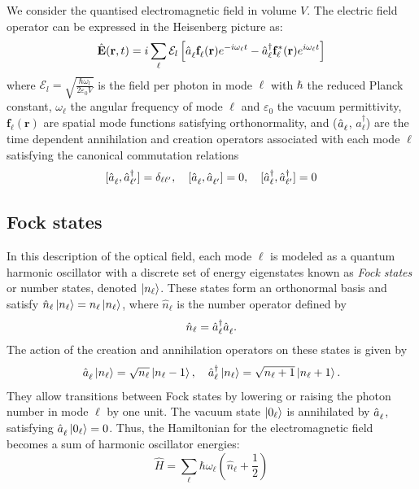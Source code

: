 We consider the quantised electromagnetic field in volume $V$. The electric field operator can be expressed in the Heisenberg picture as:
\begin{equation}
\hat{\mathbf{E}}(\mathbf{r}, t) = i \sum_{ \ell} \mathcal{E}_l \left[\hat{a}_{\ell}^{\vphantom{dagger}}\mathbf{f}_{\ell}^{\vphantom{*}}(\mathbf{r})e^{-i\omega_{\ell}t} - \hat{a}_{\ell}^\dagger \mathbf{f}_{\ell}^*(\mathbf{r}) e^{i\omega_{\ell}t}\right]
\end{equation}
where $\mathcal{E}_l = \sqrt{\frac{\hbar \omega_l}{2 \varepsilon_0 V}}$ is the field per photon in mode $\ell$ with $\hbar$ the reduced Planck constant, $\omega_\ell$ the angular frequency of mode $\ell$ and $\varepsilon_0$ the vacuum permittivity, $\mathbf{f}_{\ell}(\mathbf{r})$ are spatial mode functions satisfying orthonormality, and ($\hat{a}_{\ell}^{\vphantom{\dagger}}$, $\hat{a}_{\ell}^{\dagger}$) are the time dependent annihilation and creation operators associated with each mode $\ell$ satisfying the canonical commutation relations
\[
[\hat{a}_{\ell}^{\vphantom{\dagger}}, \hat{a}_{\ell'}^\dagger] = \delta_{\ell \ell'} , \quad
[\hat{a}_{\ell}^{\vphantom{\dagger}}, \hat{a}_{\ell'}^{\vphantom{\dagger}} ] = 0, \quad [\hat{a}_{\ell}^\dagger , \hat{a}_{\ell'}^\dagger ] = 0  
\]
\subsection*{Fock states}
In this description of the optical field, each mode $\ell$ is modeled as a quantum harmonic oscillator with a discrete set of energy eigenstates known as \textit{Fock states} or number states, denoted $\ket{n_\ell}$. These states form an orthonormal basis and satisfy $\hat{n}_{\ell} \ket{n_\ell} = n_\ell \ket{n_\ell}$, where $\hat{n}_{\ell}$ is the number operator defined by
\[
\hat{n}_{\ell} = \hat{a}_{\ell}^\dagger \hat{a}^{\vphantom{\dagger}}_{\ell}.
\]
The action of the creation and annihilation operators on these states is given by
\[
\hat{a}^{\vphantom{\dagger}}_{\ell} \ket{n_\ell} = \sqrt{n_\ell} \ket{n_\ell - 1}, \quad
\hat{a}_{\ell}^\dagger \ket{n_\ell} = \sqrt{n_\ell + 1} \ket{n_\ell + 1}.
\]
They allow transitions between Fock states by lowering or raising the photon number in mode $\ell$ by one unit. The vacuum state $\ket{0_\ell}$ is annihilated by $\hat{a}^{\vphantom{\dagger}}_{\ell}$, satisfying $\hat{a}^{\vphantom{\dagger}}_{\ell} \ket{0_\ell} = 0$. Thus, the Hamiltonian for the electromagnetic field becomes a sum of harmonic oscillator energies:
\begin{equation}
\hat{H} = \sum_\ell \hbar \omega_{\ell} \left( \hat{n}_\ell + \frac{1}{2} \right)
\end{equation}
